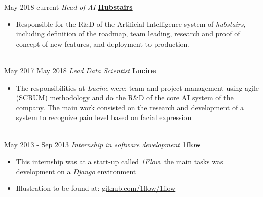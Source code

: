 \documentclass[letterpaper]{twentysecondcv} %
\begin{document}
\begin{twenty} %

  \twentyitem
  {May 2018}
    {current}
        {\textit{Head of AI}}
        {\href{http://www.hubstairs.com/}{\textbf{Hubstairs}}}
        {}
        {
          {\begin{itemize}
            \item Responsible for the R\&D of the Artificial Intelligence
              system of \textit{hubstairs}, including definition of the roadmap, team leading,
              research and proof of concept of new features, and deployment to production.
          \end{itemize}}
        }
    \\
  \twentyitem
  {May 2017}
    {May 2018}
        {\textit{Lead Data Scientist}}
        {\href{http://www.projet-lucine.com/}{\textbf{Lucine}}}
        {}
        {
          {\begin{itemize}
            \item The responsibilities at \textit{Lucine} were: team and project management
              using agile (SCRUM) methodology and do the R\&D of the core AI
              system of the company.
              The main work consisted on the research and development of a system to recognize pain level based on facial expression
          \end{itemize}}
        }
    \\


  \twentyitem
      {May 2013 -}
    {Sep 2013}
        {\textit{Internship in software development}}
        {\href{https://github.com/1flow/1flow}{\textbf{1flow}}}
        {}
        {
          {\begin{itemize}
            \item This internship was at a start-up called \textit{1Flow}. the
              main tasks was development on a \textit{Django} environment
        \item Illustration to be found at: \href{https://github.com/1flow/1flow}{github.com/1flow/1flow}
          \end{itemize}}
        }
    \\

\end{twenty}



\end{document}
